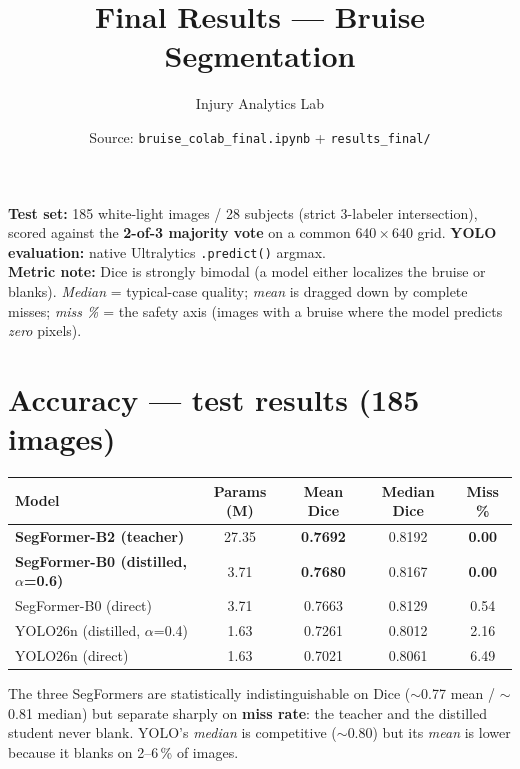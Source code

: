 \documentclass[11pt]{article}
\title{\bfseries Final Results --- Bruise Segmentation}
\author{Injury Analytics Lab}
\date{Source: \texttt{bruise\_colab\_final.ipynb} + \texttt{results\_final/}}
\newcommand{\best}[1]{\textbf{#1}}
\begin{document}
\maketitle

\noindent\textbf{Test set:} 185 white-light images / 28 subjects (strict
3-labeler intersection), scored against the \textbf{2-of-3 majority vote} on a
common $640\times640$ grid. \textbf{YOLO evaluation:} native Ultralytics
\texttt{.predict()} argmax.\\[0.3em]
\textbf{Metric note:} Dice is strongly bimodal (a model either localizes the
bruise or blanks). \emph{Median} = typical-case quality; \emph{mean} is dragged
down by complete misses; \emph{miss \%} = the safety axis (images with a bruise
where the model predicts \emph{zero} pixels).

\section{Accuracy --- test results (185 images)}

\begin{center}
\begin{tabular}{lcccc}
\toprule
Model & Params (M) & Mean Dice & Median Dice & Miss \% \\
\midrule
\best{SegFormer-B2 (teacher)}                 & 27.35 & \best{0.7692} & 0.8192 & \best{0.00} \\
\best{SegFormer-B0 (distilled, $\alpha$=0.6)} & 3.71  & \best{0.7680} & 0.8167 & \best{0.00} \\
SegFormer-B0 (direct)                         & 3.71  & 0.7663 & 0.8129 & 0.54 \\
YOLO26n (distilled, $\alpha$=0.4)             & 1.63  & 0.7261 & 0.8012 & 2.16 \\
YOLO26n (direct)                              & 1.63  & 0.7021 & 0.8061 & 6.49 \\
\bottomrule
\end{tabular}
\end{center}

The three SegFormers are statistically indistinguishable on Dice
($\sim$0.77 mean / $\sim$0.81 median) but separate sharply on \textbf{miss
rate}: the teacher and the distilled student never blank. YOLO's \emph{median}
is competitive ($\sim$0.80) but its \emph{mean} is lower because it blanks on
2--6\,\% of images.

\end{document}
